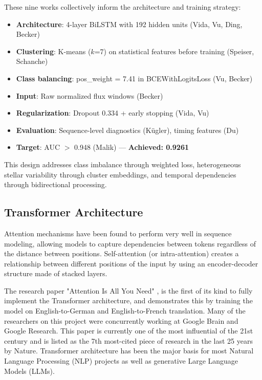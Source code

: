 \documentclass[letterpaper]{article} %
\begin{document}
These nine works collectively inform the architecture and training strategy:

\begin{itemize}
    \item \textbf{Architecture}: 4-layer BiLSTM with 192 hidden units (Vida, Vu, Ding, Becker)
    \item \textbf{Clustering}: K-means ($k$=7) on statistical features before training (Speiser, Schanche)
    \item \textbf{Class balancing}: pos\_weight = 7.41 in BCEWithLogitsLoss (Vu, Becker)
    \item \textbf{Input}: Raw normalized flux windows (Becker)
    \item \textbf{Regularization}: Dropout 0.334 + early stopping (Vida, Vu)
    \item \textbf{Evaluation}: Sequence-level diagnostics (K\"ugler), timing features (Du)
    \item \textbf{Target}: AUC $>$ 0.948 (Malik) --- \textbf{Achieved: 0.9261}
\end{itemize}

This design addresses class imbalance through weighted loss, heterogeneous stellar variability through cluster embeddings, and temporal dependencies through bidirectional processing.

\subsection{Transformer Architecture}
Attention mechanisms have been found to perform very well in sequence modeling, allowing models to capture dependencies between tokens regardless of the distance between positions. Self-attention (or intra-attention) creates a relationship between different positions of the input by using an encoder-decoder structure made of stacked layers.

The research paper "Attention Is All You Need" \cite{vaswani2017attentionneed}, is the first of its kind to fully implement the Transformer architecture, and demonstrates this by training the model on English-to-German and English-to-French translation. Many of the researchers on this project were concurrently working at Google Brain and Google Research. This paper is currently one of the most influential of the 21st century and is listed as the 7th most-cited piece of research in the last 25 years by Nature. Transformer architecture has been the major basis for most Natural Language Processing (NLP) projects as well as generative Large Language Models (LLMs).
\end{document}

